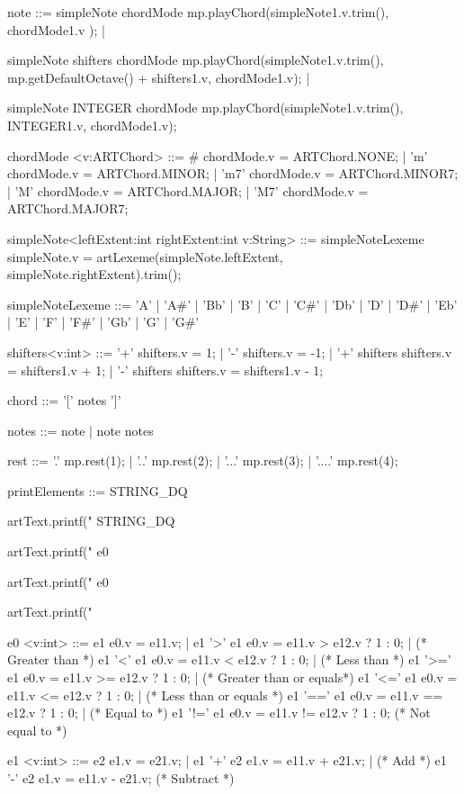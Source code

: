 \begin{codeblock}
note ::= simpleNote chordMode { mp.playChord(simpleNote1.v.trim(), chordMode1.v ); } | 
         
         simpleNote shifters chordMode 
         { mp.playChord(simpleNote1.v.trim(), mp.getDefaultOctave() + shifters1.v, chordMode1.v); } | 
         
         simpleNote INTEGER chordMode { mp.playChord(simpleNote1.v.trim(), 
          INTEGER1.v, chordMode1.v); }

chordMode <v:ARTChord> ::= # { chordMode.v = ARTChord.NONE; } | 
       'm' { chordMode.v = ARTChord.MINOR; } | 
       'm7' { chordMode.v = ARTChord.MINOR7; } | 
       'M' { chordMode.v = ARTChord.MAJOR; } | 
       'M7' { chordMode.v = ARTChord.MAJOR7; }

simpleNote<leftExtent:int rightExtent:int v:String> ::= 
  simpleNoteLexeme 
    { simpleNote.v = artLexeme(simpleNote.leftExtent, simpleNote.rightExtent).trim(); }

simpleNoteLexeme ::= 'A' | 'A#' | 'Bb' | 'B' | 'C' | 'C#' | 'Db' | 'D' | 
           'D#' | 'Eb' | 'E' | 'F' | 'F#' | 'Gb' | 'G' | 'G#'

shifters<v:int> ::= '+' {shifters.v = 1;} | '-' {shifters.v = -1;} | 
          '+' shifters {shifters.v = shifters1.v + 1; } | 
          '-' shifters {shifters.v = shifters1.v - 1; }
     
chord ::= '[' notes ']'

notes ::= note | note notes

rest ::= '.' { mp.rest(1); } | '..' { mp.rest(2); } | '...' { mp.rest(3); } | '....' { mp.rest(4); } 

printElements ::= STRING_DQ { artText.printf("%
        STRING_DQ { artText.printf("%
        e0 { artText.printf("%
        e0 { artText.printf("%

e0 <v:int> ::= e1 { e0.v = e11.v; } | 
     e1 '>'  e1 { e0.v = e11.v >  e12.v ? 1 : 0; } |       (* Greater than *)
     e1 '<'  e1 { e0.v = e11.v <  e12.v ? 1 : 0; } |       (* Less than *)
     e1 '>=' e1 { e0.v = e11.v >= e12.v ? 1 : 0; } |       (* Greater than or equals*)
     e1 '<=' e1 { e0.v = e11.v <= e12.v ? 1 : 0; } |       (* Less than or equals *)
     e1 '==' e1 { e0.v = e11.v == e12.v ? 1 : 0; } |       (* Equal to *)
     e1 '!=' e1 { e0.v = e11.v != e12.v ? 1 : 0; }         (* Not equal to *)

e1 <v:int>  ::= e2 { e1.v = e21.v; } | 
      e1 '+' e2 { e1.v = e11.v + e21.v; } |      (* Add *)
      e1 '-' e2 { e1.v = e11.v - e21.v; }        (* Subtract *)

}}}}
\end{codeblock}
